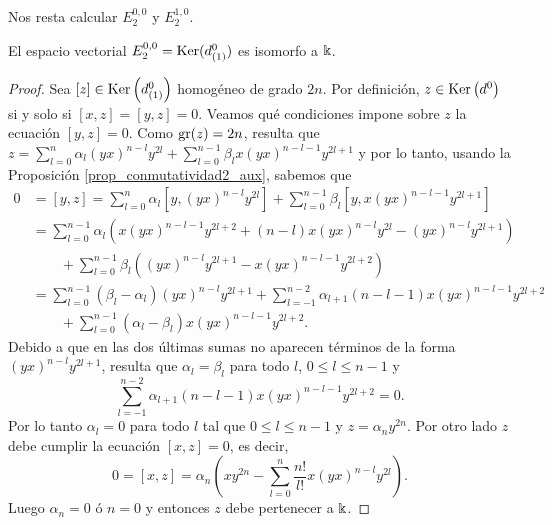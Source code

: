 \documentclass[fleqn,../tesis.tex]{subfiles}
\begin{document}
Nos resta calcular $E^{0,0}_{2}$ y $E^{1, 0}_{2}$.
\begin{prop}
    El espacio vectorial $E^{0, 0}_{2} = \operatorname{Ker}(d^{0}_{(1)})$ es isomorfo a $\Bbbk$.
\end{prop}
\begin{proof}
    Sea $[z] \in \operatorname{Ker}\left(d^{0}_{(1)}\right)$ homogéneo de grado $2n$.
    Por definición, $z \in \operatorname{Ker}\left(d^{0}\right)$ si y solo si $[x, z] = [y, z] = 0$.
    Veamos qué condiciones impone sobre $z$ la ecuación $[y, z] = 0$. Como $\operatorname{gr}(z) = 2n$, resulta que
    $z= \sum_{l = 0}^{n}\alpha_l(yx)^{n - l}y^{2l} + \sum_{l = 0}^{n - 1}\beta_l x(yx)^{n - l - 1}y^{2l + 1}$ y por lo tanto,
    usando la Proposición \ref{prop_conmutatividad2_aux}, sabemos que
    \begin{align*}
        0 &= [y, z] = \sum_{l = 0}^{n}\alpha_l\left[y, (yx)^{n - l}y^{2l}\right]
            + \sum_{l = 0}^{n - 1}\beta_l\left[y, x(yx)^{n - l - 1}y^{2l + 1}\right] \\
        &= \sum_{l = 0}^{n - 1}\alpha_l \left(x(yx)^{n - l - 1}y^{2l +2} + (n - l)x (yx)^{n - l}y^{2l} - (yx)^{n - l}y^{2l  +1}\right)\\
        &\qquad + \sum_{l = 0}^{n - 1}\beta_l \left((yx)^{n - l}y^{2l + 1} - x(yx)^{n - l - 1}y^{2l + 2}\right)\\
        & = \sum_{l = 0}^{n - 1}\left(\beta_l - \alpha_l\right)(yx)^{n - l}y^{2l + 1} 
            + \sum_{l = -1}^{n - 2}\alpha_{l + 1} (n - l - 1) x(yx)^{n - l - 1}y^{2l + 2}\\
        &\qquad + \sum_{l = 0}^{n -1}\left(\alpha_l - \beta_l \right)x(yx)^{n - l - 1}y^{2l +2}.
    \end{align*}
    Debido a que en las dos últimas sumas no aparecen términos de la forma $(yx)^{n - l}y^{2l + 1}$, resulta que $\alpha_l = \beta_l$
    para todo $l$, $0 \leq l \leq n - 1$ y
    \[
        \sum_{l = -1}^{n - 2}\alpha_{l + 1} (n - l - 1) x(yx)^{n - l - 1}y^{2l + 2} = 0.
    \]
    Por lo tanto $\alpha_l = 0$ para todo $l$ tal que $0 \leq l \leq n- 1$ y $z = \alpha_n y^{2n}$. Por otro lado $z$ debe cumplir
    la ecuación $[x, z] = 0$, es decir,
    \[
        0 = [x, z] = \alpha_n \left( xy^{2n} - \sum_{l = 0}^{n}\frac{n!}{l!}x(yx)^{n - l}y^{2l}\right).    
    \]
    Luego $\alpha_n = 0$ ó $n = 0$ y entonces $z$ debe pertenecer a $\Bbbk$.
    

\end{proof}
\end{document}
